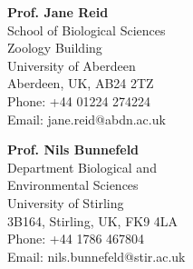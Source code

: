 \documentclass[letterpaper]{article}
\renewenvironment{itemize}{
  \begin{list}{}{
    \setlength{\leftmargin}{1.5em}
  }
}{
  \end{list}
}
\begin{document}
\begin{minipage}{0.5\linewidth}

\begin{itemize}
\item {\bf Prof. Jane Reid} \\
School of Biological Sciences \\
Zoology Building \\
University of Aberdeen \\
Aberdeen, UK, AB24 2TZ \\
Phone: +44 01224 274224 \\
Email: jane.reid@abdn.ac.uk \\

\item {\bf Prof. Nils Bunnefeld} \\
Department Biological and \\ 
Environmental Sciences \\
University of Stirling \\
3B164, Stirling, UK, FK9 4LA \\
Phone: +44 1786 467804 \\
Email: nils.bunnefeld@stir.ac.uk \\

\end{itemize}
\end{minipage}
\end{document}
